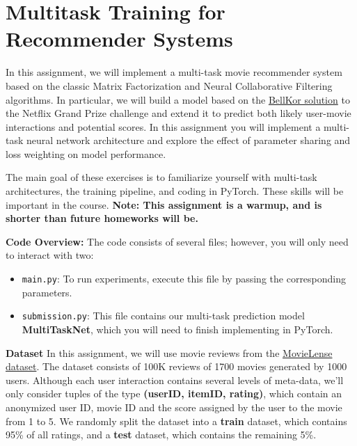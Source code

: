 \section{Multitask Training for Recommender Systems}

In this assignment, we will implement a multi-task movie recommender system based on the classic Matrix Factorization \cite{Yehuda2009matrix} and Neural Collaborative Filtering ~\cite{he2017neural} algorithms. In particular, we will build a model based on the \href{https://www2.seas.gwu.edu/~simhaweb/champalg/cf/papers/KorenBellKor2009.pdf}{BellKor solution} to the Netflix Grand Prize challenge and extend it to predict both likely user-movie interactions and potential scores. In this assignment you will implement a multi-task neural network architecture and explore the effect of parameter sharing and loss weighting on model performance.

\vspace{0.2cm}
\noindent The main goal of these exercises is to familiarize yourself with multi-task architectures, the training pipeline, and coding in PyTorch. These skills will be important in the course. \textbf{Note: This assignment is a warmup, and is shorter than future homeworks will be.}

\vspace{0.2cm}

\noindent\textbf{Code Overview:} The code consists of several files; however, you will only need to interact with two:

\begin{itemize}
    \item \texttt{main.py}: To run experiments, execute this file by passing the corresponding parameters. 
    \item \texttt{submission.py}: This file contains our multi-task prediction model \textbf{MultiTaskNet}, which you will need to finish implementing in PyTorch.
\end{itemize}

\textbf{Dataset} In this assignment, we will use movie reviews from the \href{https://grouplens.org/datasets/movielens/100k}{MovieLense dataset}. The dataset consists of 100K reviews of 1700 movies generated by 1000 users. Although each user interaction contains several levels of meta-data, we'll only consider tuples of the type \textbf{(userID, itemID, rating)}, which contain an anonymized user ID, movie ID and the score assigned by the user to the movie from 1 to 5. We randomly split the dataset into a \textbf{train} dataset, which contains 95\% of all ratings, and a \textbf{test} dataset, which contains the remaining 5\%.

